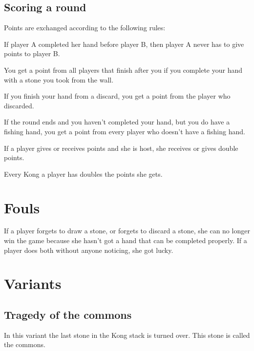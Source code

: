 \documentclass{article}
\begin{document}
\subsection{Scoring a round}
Points are exchanged according to the following rules:
\begin{itemize*}
    \item If player A completed her hand before player B, then player A never has to give points to player B.
    \item You get a point from all players that finish after you if you complete your hand with a stone you took from the wall.
    \item If you finish your hand from a discard, you get a point from the player who discarded.
    \item If the round ends and you haven't completed your hand, but you do have a fishing hand, you get a point from every player who doesn't have a fishing hand.
    \item If a player gives or receives points and she is host, she receives or gives double points.
    \item Every Kong a player has doubles the points she gets.

\end{itemize*}

\section{Fouls}
If a player forgets to draw a stone, or forgets to discard a stone, she can no longer win the game because she hasn't got a hand that can be completed properly.
If a player does both without anyone noticing, she got lucky.

\section{Variants}
\subsection{Tragedy of the commons}
In this variant the last stone in the Kong stack is turned over. This stone is called the commons.
\end{document}
